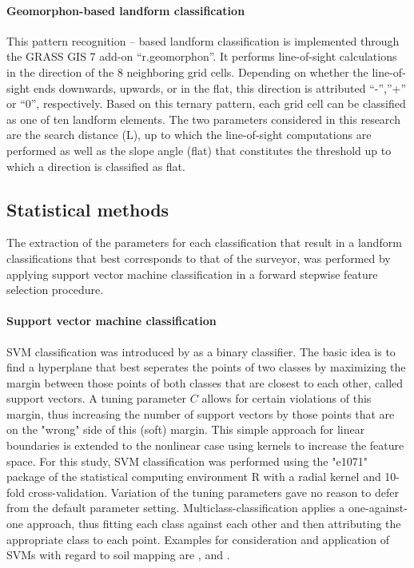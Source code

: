 \documentclass[preprint,12pt,authoryear]{elsarticle}
\begin{document}
\paragraph{Geomorphon-based landform classification \cite{Jasiewicz2013}}
This pattern recognition – based landform classification is implemented through the GRASS GIS 7 add-on “r.geomorphon”. It performs line-of-sight calculations in the direction of the 8 neighboring grid cells.  Depending on whether the line-of-sight ends downwards,  upwards, or in the flat, this direction is attributed “-”,”+” or “0”, respectively.  Based on this ternary pattern, each grid cell can be classified as one of ten landform elements. The two parameters considered in this research are the search distance (L), up to which the line-of-sight computations are performed as well as the slope angle (flat) that constitutes the threshold up to which a direction is classified as flat. 

\subsection{Statistical methods}
The extraction of the parameters for each classification that result in a landform classifications that best corresponds to that of the surveyor, was performed by applying support vector machine classification in a forward stepwise feature selection procedure.
\paragraph{Support vector machine classification}
SVM classification was introduced by \cite{Cortes1995} as a binary classifier. The basic idea is to find a hyperplane that best seperates the points of two classes by maximizing the margin between those points of both classes that are closest to each other, called support vectors. A tuning parameter $C$ allows for certain violations of this margin, thus increasing the number of support vectors by those points that are on the "wrong" side of this (soft) margin. This simple approach for linear boundaries is extended to the nonlinear case using kernels to increase the feature space. For this study, SVM classification was performed using the "e1071" package \citep{meyer2014} of the statistical computing environment R \citep{cran2014} with a radial kernel and 10-fold cross-validation. Variation of the tuning parameters gave  no reason to defer from the default parameter setting. Multiclass-classification applies a one-against-one approach, thus fitting each class against each other and then attributing the appropriate class to each point. Examples for consideration and application of SVMs with regard to soil mapping are \cite{Ballabio2009}, \cite{Behrens2006} and \cite{Rossel2010}.
\end{document}

